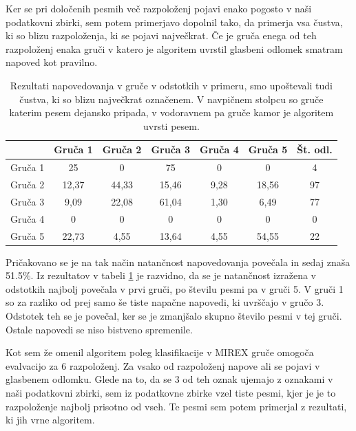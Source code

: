 \documentclass[a4paper, 12pt]{book}
\begin{document}
{Ker se pri določenih pesmih več razpoloženj pojavi enako pogosto v naši podatkovni zbirki, sem potem primerjavo dopolnil tako, da primerja vsa čustva, ki so blizu razpoloženja, ki se pojavi največkrat. Če je gruča enega od teh razpoloženj enaka gruči v katero je algoritem uvrstil glasbeni odlomek smatram napoved kot pravilno. 

\begin{table}[htb]
\begin{center}
\caption{Rezultati napovedovanja v gruče v odstotkih v primeru, smo upoštevali tudi čustva, ki so blizu največkrat označenem. V navpičnem stolpcu so gruče katerim pesem dejansko pripada, v vodoravnem pa gruče kamor je algoritem uvrsti pesem.}
\begin{tabular}{|l|c|c|c|c|c|c|}
\hline
 & Gruča 1 & Gruča 2 & Gruča 3 & Gruča 4 & Gruča 5 & Št. odl.\\ \hline
Gruča 1 & 25 & 0	& 75 & 0 & 0 & 4\\ \hline
Gruča 2 & 12,37 & 44,33 & 15,46 & 9,28 & 18,56 & 97\\ \hline
Gruča 3 & 9,09 & 22,08 & 61,04 & 1,30 & 6,49 & 77\\ \hline
Gruča 4 & 0	& 0 & 0 & 0 & 0 & 0\\ \hline
Gruča 5 & 22,73	& 4,55 & 13,64 & 4,55 & 54,55 & 22 \\ \hline

\hline
\end{tabular}
\label{natancnost_gruce_nasa_with_second}
\end{center}
\end{table}

Pričakovano se je na tak način natančnost napovedovanja povečala in sedaj znaša 51.5\%. Iz rezultatov v tabeli \ref{natancnost_gruce_nasa_with_second} je razvidno, da se je natančnost izražena v odstotkih najbolj povečala v prvi gruči, po številu pesmi pa v gruči 5. V gruči 1 so za razliko od prej samo še tiste napačne napovedi, ki uvrščajo v gručo 3. Odstotek teh se je povečal, ker se je zmanjšalo skupno število pesmi v tej gruči. Ostale napovedi se niso bistveno spremenile. 

Kot sem že omenil algoritem poleg klasifikacije v MIREX gruče omogoča evalvacijo za 6 razpoloženj. Za vsako od razpoloženj napove ali se pojavi v glasbenem odlomku. Glede na to, da se 3 od teh oznak ujemajo z oznakami v naši podatkovni zbirki, sem iz podatkovne zbirke vzel tiste pesmi, kjer je je to razpoloženje najbolj prisotno od vseh. Te pesmi sem potem primerjal z rezultati, ki jih vrne algoritem. 

}
\end{document}

